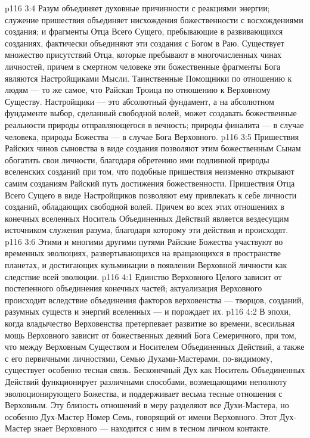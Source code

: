 \vs p116 3:4 \pc {}\bibnobreakspace {} Разум объединяет духовные причинности с реакциями энергии; служение пришествия объединяет нисхождения божественности с восхождениями создания; и фрагменты Отца Всего Сущего, пребывающие в развивающихся созданиях, фактически объединяют эти создания с Богом в Раю. Существует множество присутствий Отца, которые пребывают в многочисленных чинах личностей, причем в смертном человеке эти божественные фрагменты Бога являются Настройщиками Мысли. Таинственные Помощники по отношению к людям --- то же самое, что Райская Троица по отношению к Верховному Существу. Настройщики --- это абсолютный фундамент, а на абсолютном фундаменте выбор, сделанный свободной волей, может создавать божественные реальности природы отправляющегося в вечность; природы финалита --- в случае человека, природы Божества --- в случае Бога Верховного.
\vs p116 3:5 \pc Пришествия Райских чинов сыновства в виде создания позволяют этим божественным Сынам обогатить свои личности, благодаря обретению ими подлинной природы вселенских созданий при том, что подобные пришествия неизменно открывают самим созданиям Райский путь достижения божественности. Пришествия Отца Всего Сущего в виде Настройщиков позволяют ему привлекать к себе личности созданий, обладающих свободной волей. Причем во всех этих отношениях в конечных вселенных Носитель Объединенных Действий является вездесущим источником служения разума, благодаря которому эти действия и происходят.
\vs p116 3:6 Этими и многими другими путями Райские Божества участвуют во временных эволюциях, развертывающихся на вращающихся в пространстве планетах, и достигающих кульминации в появлении Верховной личности как следствие всей эволюции.
\vs p116 4:1 Единство Верховного Целого зависит от постепенного объединения конечных частей; актуализация Верховного происходит вследствие объединения факторов верховенства --- творцов, созданий, разумных существ и энергий вселенных --- и порождает их.
\vs p116 4:2 \pc В эпохи, когда владычество Верховенства претерпевает развитие во времени, всесильная мощь Верховного зависит от божественных деяний Бога Семеричного, при том, что между Верховным Существом и Носителем Объединенных Действий, а также с его первичными личностями, Семью Духами\hyp{}Мастерами, по\hyp{}видимому, существует особенно тесная связь. Бесконечный Дух как Носитель Объединенных Действий функционирует различными способами, возмещающими неполноту эволюционирующего Божества, и поддерживает весьма тесные отношения с Верховным. Эту близость отношений в меру разделяют все Духи\hyp{}Мастера, но особенно Дух\hyp{}Мастер Номер Семь, говорящий от имени Верховного. Этот Дух\hyp{}Мастер знает Верховного --- находится с ним в тесном личном контакте.
